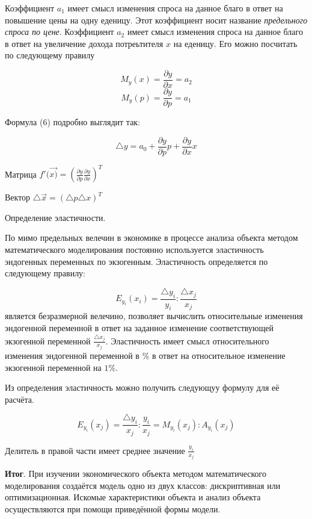 \documentclass[12pt,a4paper]{article}
\begin{document}
Коэффициент $a_1$ имеет смысл изменения спроса на данное благо в ответ на повышение цены на одну еденицу. Этот коэффициент носит название \textit{предельного спроса по цене}. Коэффициент $a_2$ имеет смысл изменения спроса на данное благо в ответ на увеличение дохода потреьтителя $x$ на еденицу. Его можно посчитать по следующему правилу

$$M_y(x) = \frac{\partial y}{\partial x} = a_2$$
$$M_y(p) = \frac{\partial y}{\partial p} = a_1$$

Формула (6) подробно выглядит так:

$$\triangle y = a_0 + \frac{\partial y}{\partial p} p + \frac{\partial y}{\partial x} x$$

Матрица $f'(\vec{x)} = \left(\frac{\partial y}{\partial p} \frac{\partial y}{\partial x} \right)^T$

Вектор $\triangle \vec{x} = (\triangle p \triangle x)^T$

Определение эластичности.

По мимо предельных велечин в экономике в процессе анализа объекта методом математического моделирования постоянно используется эластичность эндогенных переменных по экзогенным. Эластичность определяется по следующему правилу:

\begin{equation}
E_{y_i}(x_i) = \frac{\triangle y_i}{y_i} : \frac{\triangle x_j}{x_j}
\end{equation}
является безразмерной велечино, позволяет вычислить относительные изменения эндогенной переменной в ответ на заданное изменение соответствующей экзогенной переменной $\displaystyle{\frac{\triangle x_j}{x_j}}$. Эластичность имеет смысл относительного изменения эндогенной переменной в $\%$ в ответ на относительное изменение экзогенной переменной на $1\%$.

Из определения эластичность можно получить следующуу формулу для её расчёта.

$$E_{y_i}(x_j) = \frac{\triangle y_i}{x_j} : \frac{y_i}{x_j} = M_{y_i}(x_j) : A_{y_i}(x_j)$$

Делитель в правой части имеет среднее значение $\displaystyle{\frac{y_i}{x_j}}$

\textbf{Итог}. При изучении экономического объекта методом математического моделирования создаётся модель одно из двух классов: дискриптивная или оптимизационная. Искомые характеристики объекта и анализ объекта осуществляются при помощи приведённой формы модели.
\end{document}
